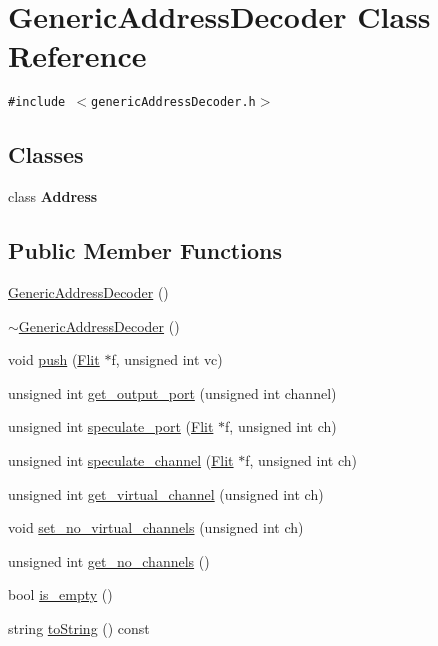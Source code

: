 \hypertarget{classGenericAddressDecoder}{
\section{GenericAddressDecoder Class Reference}
\label{classGenericAddressDecoder}
}
{\tt \#include $<$genericAddressDecoder.h$>$}

\subsection*{Classes}
\begin{CompactItemize}
\item 
class \textbf{Address}
\end{CompactItemize}
\subsection*{Public Member Functions}
\begin{CompactItemize}
\item 
\hyperlink{classGenericAddressDecoder_c9f3d12b792ee1821499d4e332b52690}{GenericAddressDecoder} ()
\item 
\hyperlink{classGenericAddressDecoder_9d20e3a126b7aa5ec9865ee6a4e1a6eb}{$\sim$GenericAddressDecoder} ()
\item 
void \hyperlink{classGenericAddressDecoder_8a2cc1c7e48dbbf11b03c49a3ce3e1d9}{push} (\hyperlink{classFlit}{Flit} $\ast$f, unsigned int vc)
\item 
unsigned int \hyperlink{classGenericAddressDecoder_3bab82f615b42ee907d37a6f601bd527}{get\_\-output\_\-port} (unsigned int channel)
\item 
unsigned int \hyperlink{classGenericAddressDecoder_d7d7f4cb63e720fd70d886eb6d11e812}{speculate\_\-port} (\hyperlink{classFlit}{Flit} $\ast$f, unsigned int ch)
\item 
unsigned int \hyperlink{classGenericAddressDecoder_81457cd722fd50e8297078e0729ea6b5}{speculate\_\-channel} (\hyperlink{classFlit}{Flit} $\ast$f, unsigned int ch)
\item 
unsigned int \hyperlink{classGenericAddressDecoder_99bfff56c04910dd0e3e397f8168d489}{get\_\-virtual\_\-channel} (unsigned int ch)
\item 
void \hyperlink{classGenericAddressDecoder_8473f733b74bc46dbcda7a5a4cdd4420}{set\_\-no\_\-virtual\_\-channels} (unsigned int ch)
\item 
unsigned int \hyperlink{classGenericAddressDecoder_339ae939c2361faac88813f1af3ce796}{get\_\-no\_\-channels} ()
\item 
bool \hyperlink{classGenericAddressDecoder_c11da10c5593e9677c0a19b6dfea46d8}{is\_\-empty} ()
\item 
string \hyperlink{classGenericAddressDecoder_5b4395166709804b6dd9cb784bc45a1d}{toString} () const 
\end{CompactItemize}

